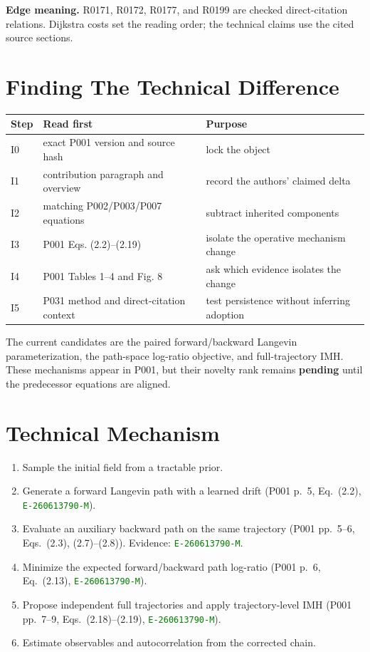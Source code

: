 \documentclass[10pt]{article}
\newcommand{\eid}[1]{\textcolor{green}{\texttt{#1}}}
\newcommand{\status}[1]{\textcolor{rose}{\textbf{#1}}}
\begin{document}
\noindent\textbf{Edge meaning.} R0171, R0172, R0177, and R0199 are checked
direct-citation relations. Dijkstra costs set the reading order; the technical
claims use the cited source sections.

\section{Finding The Technical Difference}

\begin{tabularx}{\linewidth}{@{}p{1.05cm}Y Y@{}}
\toprule
Step & Read first & Purpose \\
\midrule
I0 & exact P001 version and source hash & lock the object \\
I1 & contribution paragraph and overview & record the authors' claimed delta \\
I2 & matching P002/P003/P007 equations & subtract inherited components \\
I3 & P001 Eqs. (2.2)--(2.19) & isolate the operative mechanism change \\
I4 & P001 Tables 1--4 and Fig. 8 & ask which evidence isolates the change \\
I5 & P031 method and direct-citation context & test persistence without inferring adoption \\
\bottomrule
\end{tabularx}

\medskip
The current candidates are the paired forward/backward Langevin
parameterization, the path-space log-ratio objective, and full-trajectory IMH.
These mechanisms appear in P001, but their novelty rank remains
\status{pending} until the predecessor equations are aligned.

\section{Technical Mechanism}

\begin{enumerate}
\item Sample the initial field from a tractable prior.
\item Generate a forward Langevin path with a learned drift
  (P001 p.~5, Eq.~(2.2), \eid{E-260613790-M}).
\item Evaluate an auxiliary backward path on the same trajectory
  (P001 pp.~5--6, Eqs.~(2.3), (2.7)--(2.8)).
  Evidence: \eid{E-260613790-M}.
\item Minimize the expected forward/backward path log-ratio
  (P001 p.~6, Eq.~(2.13), \eid{E-260613790-M}).
\item Propose independent full trajectories and apply trajectory-level IMH
  (P001 pp.~7--9, Eqs.~(2.18)--(2.19), \eid{E-260613790-M}).
\item Estimate observables and autocorrelation from the corrected chain.
\end{enumerate}
\end{document}
